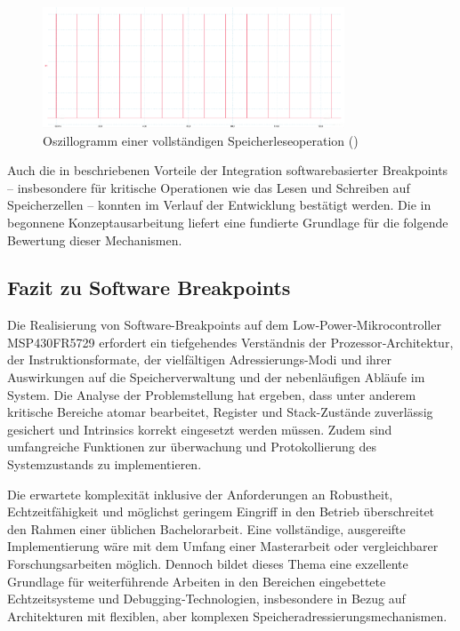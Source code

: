 \newpage
\begin{figure}[h!]
	\centering
	\includegraphics[width=0.8\textwidth]{../Bilder/BA_MSP430_Observer_Zeitmessungen/ReadMem_Complete_zoomed_rdm_0x1C00_13.png}
	\caption{Oszillogramm einer vollst\"andigen Speicherleseoperation ()}
	\label{fig:zeichenorientiertes_lesen}
\end{figure}

Auch die in  beschriebenen Vorteile der Integration softwarebasierter Breakpoints -- insbesondere f\"ur kritische Operationen wie das Lesen und Schreiben auf Speicherzellen -- konnten im Verlauf der Entwicklung best\"atigt werden. Die in  begonnene Konzeptausarbeitung liefert eine fundierte Grundlage f\"ur die folgende Bewertung dieser Mechanismen.


\subsection{Fazit zu Software Breakpoints}
\label{sec:FazitSoftwareBreakpoints}

Die Realisierung von Software-Breakpoints auf dem Low‑Power‑Mikrocontroller MSP430FR5729 erfordert ein tiefgehendes Verst\"andnis der Prozessor‑Architektur, der Instruktionsformate, der vielf\"altigen Adressierungs-Modi und ihrer Auswirkungen auf die Speicherverwaltung und der nebenl\"aufigen Abl\"aufe im System. Die Analyse der Problemstellung hat ergeben, dass unter anderem kritische Bereiche atomar bearbeitet, Register und Stack-Zust\"ande zuverl\"assig gesichert und Intrinsics korrekt eingesetzt werden m\"ussen. Zudem sind umfangreiche Funktionen zur \"uberwachung und Protokollierung des Systemzustands zu implementieren.

Die erwartete komplexit\"at inklusive der Anforderungen an Robustheit, Echtzeitf\"ahigkeit und m\"oglichst geringem Eingriff in den Betrieb \"uberschreitet den Rahmen einer \"ublichen Bachelorarbeit. Eine vollst\"andige, ausgereifte Implementierung w\"are mit dem Umfang einer Masterarbeit oder vergleichbarer Forschungsarbeiten m\"oglich. Dennoch bildet dieses Thema eine exzellente Grundlage f\"ur weiterf\"uhrende Arbeiten in den Bereichen eingebettete Echtzeitsysteme und Debugging‑Technologien, insbesondere in Bezug auf Architekturen mit flexiblen, aber komplexen Speicheradressierungsmechanismen.

